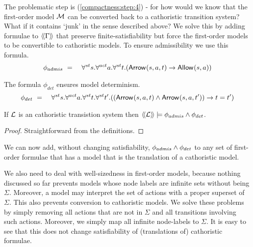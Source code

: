 \NI The problematic step is (\ref{compactness:step:4}) - for how would
we know that the first-order model $\mathcal{M}$ can be converted back to
a cathoristic transition system? What if it contains `junk' in the
sense described above?  
We solve this by adding formulae to 
$\langle\!\langle \Gamma \rangle\!\rangle$ that preserve finite-satisfiability but force the
first-order models to be convertible to cathoristic models.
 To ensure admissibility we use this formula.
\begin{eqnarray*}
   \phi_{admis} 
      & \ =\ &
   \forall^{st} s.\forall^{act} a.\forall^{st} t.( \mathsf{Arrow}^{}(s, a, t) \rightarrow \mathsf{Allow}^{}(s, a)) 
\end{eqnarray*}

\NI The formula $\phi_{det}$ ensures model determinism.
\begin{eqnarray*}
   \phi_{det} 
      & \ =\ &
   \forall^{st} s.\forall^{act} a.\forall^{st} t.\forall^{st} t'.
   ((\mathsf{Arrow}^{}(s, a, t)  \land \mathsf{Arrow}^{}(s, a, t') ) \rightarrow t = t' )   
\end{eqnarray*}

\begin{lemma}\label{compactness:lemma:23399}
If $\mathcal{L}$ is an cathoristic transistion system then $\langle\!\langle \mathcal{L} \rangle\!\rangle \models
\phi_{admis} \land \phi_{det}$.
\end{lemma}

\begin{proof}
Straightforward from the definitions.
\end{proof}

We can now add, without changing satisfiability, $\phi_{admis}
\land \phi_{det}$ to any set of first-order formulae that has a model
that is the translation of a cathoristic model.

We also need to deal with well-sizedness in first-order models,
because nothing discussed so far prevents models whose node labels are
infinite sets without being $\Sigma$.  Moreover, a model may interpret
the set of actions with a proper superset of $\Sigma$.  This also
prevents conversion to cathoristic models. We solve these problems by
simply removing all actions that are not in $\Sigma$ and all
transitions involving such actions.  Moreover, we simply map all
infinite node-labels to $\Sigma$. It is easy to see that this does not
change satisfiability of (translations of) cathoristic formulae.


